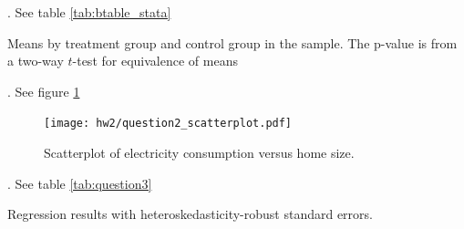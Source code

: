 \documentclass{article}
\begin{document}
. See table \ref{tab:btable_stata}

\begin{table}[h]
    \centering
    
    \caption{Means by treatment group and control group in the sample.  The p-value is from a two-way \(t\)-test for equivalence of means}
    \label{tab:btable_stata}
\end{table}

. See figure \ref{fig:scatter}

\begin{figure}[h]
    \centering
    \texttt{[image: hw2/question2\_scatterplot.pdf]}
    \caption{Scatterplot of electricity consumption versus home size.}
    \label{fig:scatter}
\end{figure}

. See table \ref{tab:question3}

\begin{table}[]
    \centering
    
    \caption{Regression results with heteroskedasticity-robust standard errors.}
    \label{tab:question3}
\end{table}
\end{document}
